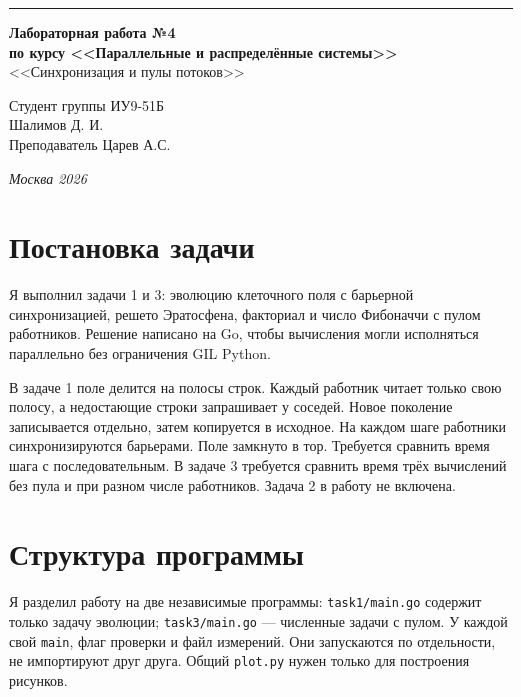 \documentclass[a4paper,14pt]{extarticle}
\begin{document}
\begin{titlepage}
\vspace*{-16pt}
\hspace{30pt}\rule{0.866\textwidth}{0.4pt}

\vspace{11em}

\begin{center}
\Large \textbf{Лабораторная работа №4} \\
\large \textbf{по курсу <<Параллельные и распределённые системы>>} \\
\large <<Синхронизация и пулы потоков>>
\end{center}

\normalsize

\vspace{8em}

\begin{flushright}
Студент группы ИУ9-51Б \\
Шалимов Д. И. \\
\vspace{2ex}
Преподаватель Царев А.С.
\end{flushright}

\bigskip
\vfill

\begin{center}
\textsl{Москва 2026}
\end{center}
\end{titlepage}

\setcounter{page}{2}
\tableofcontents
\newpage




\section{Постановка задачи}
Я выполнил задачи 1 и 3: эволюцию клеточного поля с барьерной
синхронизацией, решето Эратосфена, факториал и число Фибоначчи с пулом
работников. Решение написано на Go, чтобы вычисления могли исполняться
параллельно без ограничения GIL Python.

В задаче 1 поле делится на полосы строк. Каждый работник читает только
свою полосу, а недостающие строки запрашивает у соседей.
Новое поколение записывается отдельно, затем копируется в исходное.
На каждом шаге работники синхронизируются барьерами.
Поле замкнуто в тор. Требуется сравнить время шага с последовательным.
В задаче 3 требуется сравнить время трёх вычислений без пула и при
разном числе работников. Задача 2 в работу не включена.

\section{Структура программы}
Я разделил работу на две независимые программы:
\texttt{task1/main.go} содержит только задачу эволюции;
\texttt{task3/main.go} --- численные задачи с пулом.
У каждой свой \texttt{main}, флаг проверки и файл измерений.
Они запускаются по отдельности, не импортируют друг друга.
Общий \texttt{plot.py} нужен только для построения рисунков.
\end{document}
